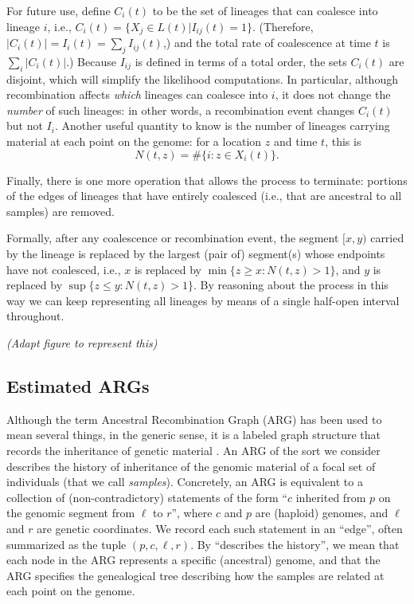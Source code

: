 \documentclass{article}
\newcommand{\comment}[1]{{\it \color{orange} (#1)}}
\begin{document}
For future use, define $C_i(t)$ to be the set of lineages that can coalesce into lineage $i$,
i.e., $C_i(t) = \{X_j \in L(t) | I_{ij}(t) = 1\}$.
(Therefore, $|C_i(t)| = I_{i}(t) = \sum_{j} I_{ij}(t)$,)
and the total rate of coalescence at time $t$ is $\sum_{i} |C_i(t)|$.) 
Because $I_{ij}$ is defined in terms of a total order, the sets $C_i(t)$ are disjoint,
which will simplify the likelihood computations.
In particular,
although recombination affects \emph{which} lineages can coalesce into $i$,
it does not change the \emph{number} of such lineages:
in other words, a recombination event changes $C_i(t)$ but not $I_{i}$.
Another useful quantity to know is the number of lineages carrying material
at each point on the genome:
for a location $z$ and time $t$, this is
\begin{equation}
    N(t,z) = \#\{i : z \in X_i(t) \} .
\end{equation}

Finally, there is one more operation that allows the process to terminate:
portions of the edges of lineages that have entirely coalesced
(i.e., that are ancestral to all samples) are removed.

Formally, after any coalescence or recombination event,
the segment $[x,y)$ carried by the lineage
is replaced by the largest (pair of) segment(s) whose endpoints have not
coalesced, i.e., $x$ is replaced by $\min\{ z \ge x : N(t,z) > 1\}$,
and $y$ is replaced by $\sup\{ z \le y : N(t,z) > 1\}$.
By reasoning about the process in this way we can keep representing 
all lineages by means of a single half-open interval throughout.

\comment{Adapt figure to represent this}

\subsection{Estimated ARGs} \label{par:recording}

Although the term Ancestral Recombination Graph (ARG) has been used to mean several things,
in the generic sense, it is a labeled graph structure that records
the inheritance of genetic material \citep{wong_general_2023}.
An ARG of the sort we consider describes the history of inheritance
of the genomic material of a focal set of individuals (that we call \emph{samples}).
Concretely, an ARG is equivalent to a collection of (non-contradictory) statements
of the form ``$c$ inherited from $p$ on the genomic segment from $\ell$ to $r$'',
where $c$ and $p$ are (haploid) genomes, and $\ell$ and $r$ are genetic coordinates.
We record each such statement in an ``edge'',
often summarized as the tuple $(p,c,\ell,r)$.
By ``describes the history'',
we mean that each node in the ARG represents a specific (ancestral) genome,
and that the ARG specifies the genealogical tree describing how the samples are related
at each point on the genome.
\end{document}

